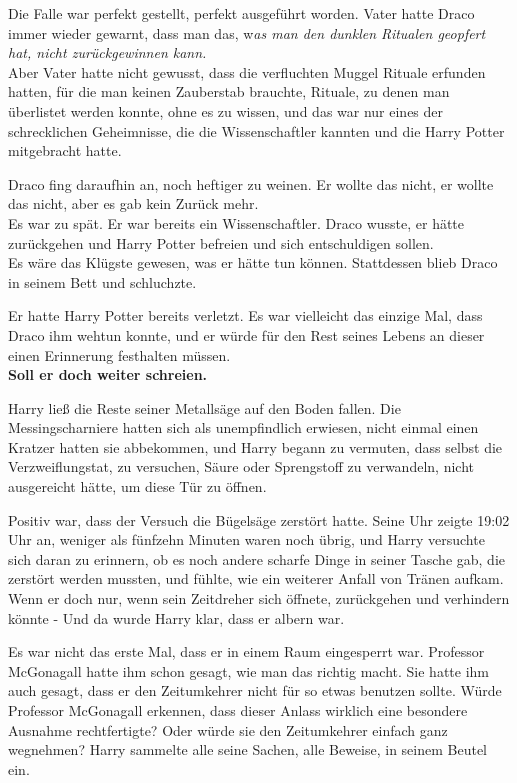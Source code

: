 {Die Falle war perfekt gestellt, perfekt ausgeführt worden. Vater hatte Draco immer wieder gewarnt, dass man das, w\emph{as man den dunklen Ritualen geopfert hat, nicht zurückgewinnen kann.}\\ Aber Vater hatte nicht gewusst, dass die verfluchten Muggel Rituale erfunden hatten, für die man keinen Zauberstab brauchte, Rituale, zu denen man überlistet werden konnte, ohne es zu wissen, und das war nur eines der schrecklichen Geheimnisse, die die Wissenschaftler kannten und die Harry Potter mitgebracht hatte.

Draco fing daraufhin an, noch heftiger zu weinen. Er wollte das nicht, er wollte das nicht, aber es gab kein Zurück mehr.\\ Es war zu spät. Er war bereits ein Wissenschaftler. Draco wusste, er hätte zurückgehen und Harry Potter befreien und sich entschuldigen sollen.\\ Es wäre das Klügste gewesen, was er hätte tun können. Stattdessen blieb Draco in seinem Bett und schluchzte.

Er hatte Harry Potter bereits verletzt. Es war vielleicht das einzige Mal, dass Draco ihm wehtun konnte, und er würde für den Rest seines Lebens an dieser einen Erinnerung festhalten müssen.\\

\textbf{Soll er doch weiter schreien.}

Harry ließ die Reste seiner Metallsäge auf den Boden fallen. Die Messingscharniere hatten sich als unempfindlich erwiesen, nicht einmal einen Kratzer hatten sie abbekommen, und Harry begann zu vermuten, dass selbst die Verzweiflungstat, zu versuchen, Säure oder Sprengstoff zu verwandeln, nicht ausgereicht hätte, um diese Tür zu öffnen.

Positiv war, dass der Versuch die Bügelsäge zerstört hatte. Seine Uhr zeigte 19:02 Uhr an, weniger als fünfzehn Minuten waren noch übrig, und Harry versuchte sich daran zu erinnern, ob es noch andere scharfe Dinge in seiner Tasche gab, die zerstört werden mussten, und fühlte, wie ein weiterer Anfall von Tränen aufkam.\\ Wenn er doch nur, wenn sein Zeitdreher sich öffnete, zurückgehen und verhindern könnte - Und da wurde Harry klar, dass er albern war.

Es war nicht das erste Mal, dass er in einem Raum eingesperrt war. Professor McGonagall hatte ihm schon gesagt, wie man das richtig macht. Sie hatte ihm auch gesagt, dass er den Zeitumkehrer nicht für so etwas benutzen sollte. Würde Professor McGonagall erkennen, dass dieser Anlass wirklich eine besondere Ausnahme rechtfertigte? Oder würde sie den Zeitumkehrer einfach ganz wegnehmen? Harry sammelte alle seine Sachen, alle Beweise, in seinem Beutel ein.

}
